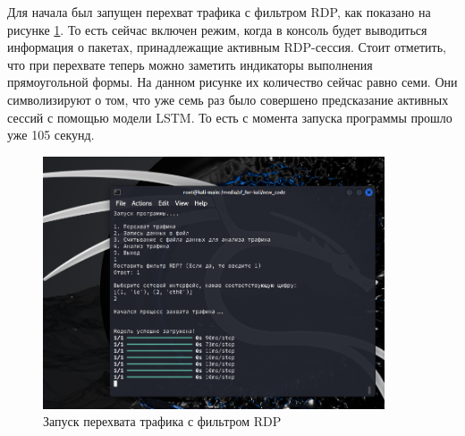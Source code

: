 \documentclass[bachelor, och, coursework]{SCWorks}
\begin{document}
Для начала был запущен перехват трафика с фильтром RDP, как показано на рисунке \ref{main1}. То есть сейчас включен режим, когда в консоль 
будет выводиться информация о пакетах, принадлежащие активным RDP-сессия. Стоит отметить, что при перехвате теперь можно заметить индикаторы выполнения прямоугольной
формы. На данном рисунке их количество сейчас равно семи. Они символизируют о том, что уже семь раз было совершено предсказание активных 
сессий с помощью модели LSTM. То есть с момента запуска программы прошло уже 105 секунд.

\begin{figure}[H]
  \centering
  \includegraphics[width=0.9\textwidth]{pics/main-view.png}
  \caption{Запуск перехвата трафика с фильтром RDP}
  \label{main1}
\end{figure}





\end{document}
